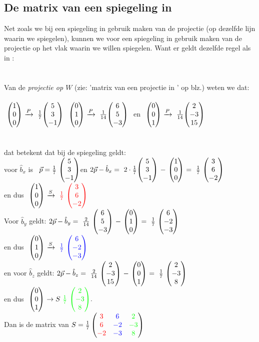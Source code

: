 
\subsection{De matrix van een spiegeling in \RD}
Net zoals we bij een spiegeling in \RT gebruik maken van de projectie (op dezelfde lijn waarin we spiegelen), kunnen we voor een spiegeling in \RD gebruik maken van de projectie op het vlak waarin we willen spiegelen. Want er geldt dezelfde regel als in \RT:\\ \\

 \\ 

Van de \textit{projectie op $W$}  (zie:  'matrix van een projectie in \RD' op blz.\pageref{projectieR3}) weten we dat:\\ \\
$ \ \vecdrie{1}{0}{0}   \  \xrightarrow{P}  \  \frac{1}{7}\vecdrie {5 } {3}{-1} $
\quad   $ \ \vecdrie{0}{1}{0}   \  \xrightarrow{P}  \ \frac{1}{14}  \vecdrie{ 6 }{5 }{-3 }\ $ 
en \quad  
$  \ \vecdrie{0}{0}{1}   \  \xrightarrow{P}  \  \frac{1}{14}  \vecdrie{2 }{-3 }{15}\ $\\ \\ \\
dat betekent dat bij de spiegeling geldt:\\
voor $ \hat{b}_x $ is \  
$\vec{p} =  \frac{1}{7} \ \vecdrie {5 } {3}{-1} $\quad  en \quad 
$ 2\vec{p}  -  \hat{b}_x  = 
\ 2 \cdot  \frac{1}{7} \vecdrie {5 } {3}{-1} \  - \  \vecdrie{1}{0}{0}  \ =
\   \frac{1}{7} \ \vecdrie {3 } {6}{-2} $ \\en dus 
$ \ \vecdrie{1}{0}{0}   \  \xrightarrow{S}  \  { \color{red}\frac{1}{7}} \  \vecdrie[red] {3 } {6}{-2} $\\
Voor $ \hat{b}_y  $ geldt:
$ 2\vec{p}  -  \hat{b}_y  =  
\ \frac{2}{14} \ \vecdrie {6 } {5}{-3} \  - \  \vecdrie{0}{1}{0}  \ = 
\   \frac{1}{7} \ \vecdrie {6 } {-2}{-3} $  \\ en dus  \quad 
$ \ \vecdrie{0}{1}{0}   \  \xrightarrow{S}  \  { \color{blue}\frac{1}{7}} \  \vecdrie[blue] {6 } {-2}{-3} $\\
en voor $ \hat{b}_z  $ geldt:
$ 2\vec{p}  -  \hat{b}_z  =  
\ \frac{2}{14} \ \vecdrie {2 } {-3}{15} \  - \  \vecdrie{0}{0}{1}  \ = 
\   \frac{1}{7} \ \vecdrie {2 } {-3}{8} $   \\ en dus 
$ \ \vecdrie{0}{0}{1}   \  \rightarrow{S}  \  { \color{green}\frac{1}{7}} \  \vecdrie[green] {2} {-3}{8}. $\\
Dan is de matrix van 
$ S = 
\frac{1}{7} \begin{pmatrix}   {\color{red}3} &  {\color{blue}6} &   {\color{green}2}  \\    {\color{red}6}   &   {\color{blue}-2} &  {\color{green}-3}  \\   {\color{red}-2} &   {\color{blue}-3}  &   {\color{green}8} \end{pmatrix} $

